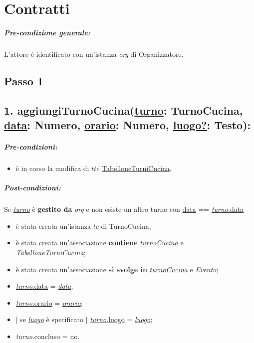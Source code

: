 \chapter{Contratti}
\paragraph{Pre-condizione generale:} L'attore è identificato con un'istanza \textit{org} di Organizzatore.

\section{Passo 1}
\section*{1. aggiungiTurnoCucina(\underline{turno}: TurnoCucina, \underline{data}: Numero, \underline{orario}: Numero, \underline{luogo?}: Testo):}

\paragraph{Pre-condizioni:} 
\begin{itemize}
    \item è in corso la modifica di $ttc$ \underline{TabelloneTurniCucina}.
\end{itemize}

\paragraph{Post-condizioni:} Se \underline{\textit{turno}} è \textbf{gestito da} \textit{org} e non esiste un altro turno con \underline{data} == \underline{\textit{turno}.data} 

\begin{itemize}
    \item è stata creata un'istanza $tc$ di TurnoCucina;
    \item è stata creata un'associazione \textbf{contiene} \underline{\textit{turnoCucina}} e \textit{TabelloneTurniCucina};
    \item è stata creata un'associazione \textbf{si svolge in} \underline{\textit{turnoCucina}} e \textit{Evento};
    \item \underline{\textit{turno}.data} = \underline{\textit{data}};
    \item \underline{\textit{turno}.orario} = \underline{\textit{orario}};
    \item $[$ se \underline{\textit{luogo}} è specificato $]$ \underline{\textit{turno}.luogo} = \underline{\textit{luogo}};
    \item \textit{turno}.concluso  = no.
\end{itemize}

